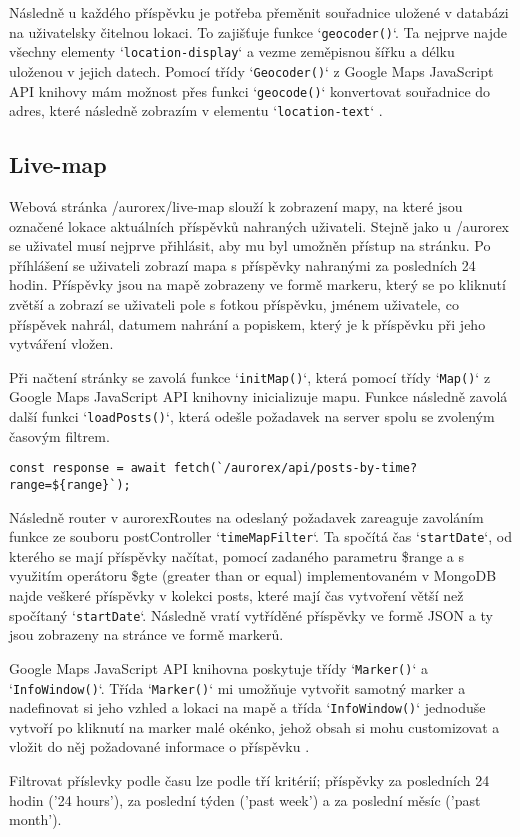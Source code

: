 \par Následně u každého příspěvku je potřeba přeměnit souřadnice uložené v databázi na uživatelsky čitelnou lokaci. To zajišťuje funkce `\texttt{geocoder()}`. Ta nejprve najde všechny elementy `\texttt{location-display}` a vezme zeměpisnou šířku a délku uloženou v jejich datech. Pomocí třídy `\texttt{Geocoder()}` z Google Maps JavaScript API knihovy mám možnost přes funkci `\texttt{geocode()}` konvertovat souřadnice do adres, které následně zobrazím v elementu `\texttt{location-text}` \cite{latlong_to_address} \cite{geoapify_geocoding}.

\subsection{Live-map}

\par Webová stránka /aurorex/live-map slouží k zobrazení mapy, na které jsou označené lokace aktuálních příspěvků nahraných uživateli. Stejně jako u /aurorex se uživatel musí nejprve přihlásit, aby mu byl umožněn přístup na stránku. Po příhlášení se uživateli zobrazí mapa s příspěvky nahranými za posledních 24 hodin. Příspěvky jsou na mapě zobrazeny ve formě markeru, který se po kliknutí zvětší a zobrazí se uživateli pole s fotkou příspěvku, jménem uživatele, co příspěvek nahrál, datumem nahrání a popiskem, který je k příspěvku při jeho vytváření vložen.
\par Při načtení stránky se zavolá funkce `\texttt{initMap()}`, která pomocí třídy `\texttt{Map()}` z Google Maps JavaScript API knihovny  inicializuje mapu. Funkce následně zavolá další funkci `\texttt{loadPosts()}`, která odešle požadavek na server spolu se zvoleným časovým filtrem.

\begin{lstlisting}[caption = {Cesta pro vyžádání příspěvků pro live-map},label = {lst:stranka}]
const response = await fetch(`/aurorex/api/posts-by-time?range=${range}`);
\end{lstlisting}

Následně router v aurorexRoutes na odeslaný požadavek zareaguje zavoláním funkce ze souboru postController `\texttt{timeMapFilter}`. Ta spočítá čas `\texttt{startDate}`, od kterého se mají příspěvky načítat, pomocí zadaného parametru \$range a s využitím operátoru \$gte (greater than or equal) implementovaném v MongoDB najde veškeré příspěvky v kolekci posts, které mají čas vytvoření větší než spočítaný `\texttt{startDate}`. Následně vratí vytříděné příspěvky ve formě JSON a ty jsou zobrazeny na stránce ve formě markerů.
\par Google Maps JavaScript API knihovna poskytuje třídy `\texttt{Marker()}` a `\texttt{InfoWindow()}`. Třída `\texttt{Marker()}` mi umožňuje vytvořit samotný marker a nadefinovat si jeho vzhled a lokaci na mapě a třída `\texttt{InfoWindow()}` jednoduše vytvoří po kliknutí na marker malé okénko, jehož obsah si mohu customizovat a vložit do něj požadované informace o příspěvku \cite{google_maps_infowindow}.
\par Filtrovat příslevky podle času lze podle tří kritérií; příspěvky za posledních 24 hodin ('24 hours'), za poslední týden ('past week') a za poslední měsíc ('past month'). 

